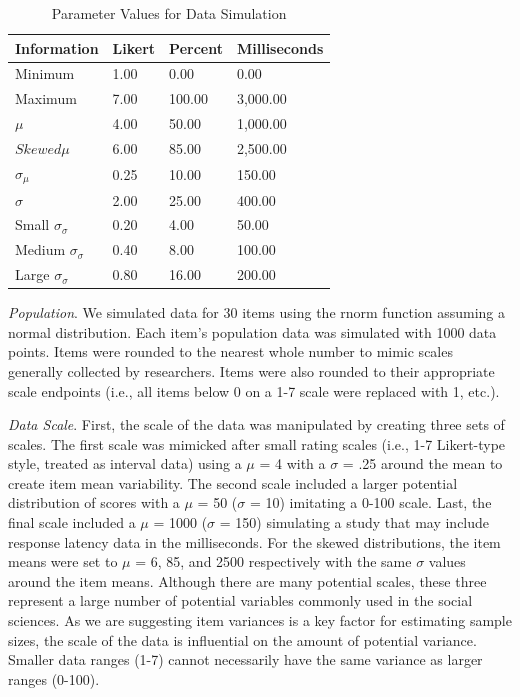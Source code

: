 \documentclass[
  man]{apa7}
\begin{document}
\begin{table}[tbp]

\begin{center}
\begin{threeparttable}

\caption{\label{tab:table-sim}Parameter Values for Data Simulation}

\begin{tabular}{llll}
\toprule
Information & \multicolumn{1}{c}{Likert} & \multicolumn{1}{c}{Percent} & \multicolumn{1}{c}{Milliseconds}\\
\midrule
Minimum & 1.00 & 0.00 & 0.00\\
Maximum & 7.00 & 100.00 & 3,000.00\\
$\mu$ & 4.00 & 50.00 & 1,000.00\\
$Skewed \mu$ & 6.00 & 85.00 & 2,500.00\\
$\sigma_{\mu}$ & 0.25 & 10.00 & 150.00\\
$\sigma$ & 2.00 & 25.00 & 400.00\\
Small $\sigma_{\sigma}$ & 0.20 & 4.00 & 50.00\\
Medium $\sigma_{\sigma}$ & 0.40 & 8.00 & 100.00\\
Large $\sigma_{\sigma}$ & 0.80 & 16.00 & 200.00\\
\bottomrule
\end{tabular}

\end{threeparttable}
\end{center}

\end{table}

\emph{Population}. We simulated data for 30 items using the rnorm function assuming a normal distribution. Each item's population data was simulated with 1000 data points. Items were rounded to the nearest whole number to mimic scales generally collected by researchers. Items were also rounded to their appropriate scale endpoints (i.e., all items below 0 on a 1-7 scale were replaced with 1, etc.).

\emph{Data Scale}. First, the scale of the data was manipulated by creating three sets of scales. The first scale was mimicked after small rating scales (i.e., 1-7 Likert-type style, treated as interval data) using a \(\mu\) = 4 with a \(\sigma\) = .25 around the mean to create item mean variability. The second scale included a larger potential distribution of scores with a \(\mu\) = 50 (\(\sigma\) = 10) imitating a 0-100 scale. Last, the final scale included a \(\mu\) = 1000 (\(\sigma\) = 150) simulating a study that may include response latency data in the milliseconds. For the skewed distributions, the item means were set to \(\mu\) = 6, 85, and 2500 respectively with the same \(\sigma\) values around the item means. Although there are many potential scales, these three represent a large number of potential variables commonly used in the social sciences. As we are suggesting item variances is a key factor for estimating sample sizes, the scale of the data is influential on the amount of potential variance. Smaller data ranges (1-7) cannot necessarily have the same variance as larger ranges (0-100).
\end{document}
